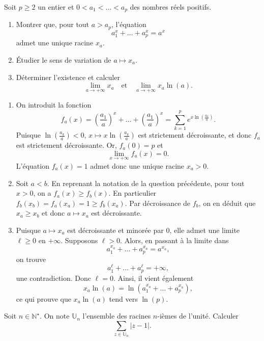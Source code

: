 \documentclass[a4paper, 11pt,openany]{book}%
\newtheorem[L]{thm}{Théorème}[section]
\newtheorem[M]{propo}[thm]{Proposition}
\newtheorem[M]{prop}[thm]{Propriété}
\newtheorem[M]{coro}[thm]{Corollaire}
\newtheorem[M]{lem}[thm]{Lemme}
\newtheorem[M,bodystyle=]{defi}[thm]{Définition}
\newtheorem[M,bodystyle=]{remark}[thm]{Remarque}
\newtheorem[M,bodystyle=]{met}[thm]{Méthode}
\newtheorem[M,bodystyle=]{ret}[thm]{A retenir}
\newtheorem[M,bodystyle=]{idee}[thm]{Idée}
\newtheorem[style=S,underline=false,bodystyle=]{exem}[thm]{Exemple}
\newtheorem[S,underline=false,bodystyle=]{exo}[thm]{Exercice}
\newtheorem[S,underline=false,bodystyle=]{appli}[thm]{Application}
\newtheorem[S,underline=false,bodystyle=]{sol}[thm]{Solution}
\newtheorem[S,underline=false,bodystyle=]{hypo}[thm]{Hypothesis}
\newtheorem[S,underline=false,bodystyle=]{nota}[thm]{Notation}
\begin{document}
\begin{exo}

Soit $p \geqslant 2$ un entier et $0<a_1< \dots <a_p$ des nombres réels positifs.
\begin{enumerate}
\item Montrer que, pour tout $a>a_p$, l'équation 
\[ a_1^x+ \dots +a_p^x =a^x\]
 admet une unique racine $x_a$.
 \item Étudier le sens de variation de $a \mapsto x_a$.
 \item Déterminer l'existence et calculer 
 \[ \lim_{a\to + \infty} x_a \quad \text{et} \quad \lim_{ a \to + \infty} x_a \ln(a). \]
\end{enumerate}

\end{exo}


\begin{sol}

\begin{enumerate}
\item On introduit la fonction 
\[ f_a(x)= \left( \frac{a_1}{a} \right)^x + \dots + \left( \frac{a_1}{a} \right)^x = \sum_{k=1}^p e^{x \ln \left( \frac{a_k}{a} \right)}.\]
Puisque $\ln \left( \frac{a_k}{a} \right)<0$, $x \mapsto x\ln \left( \frac{a_k}{a} \right)$ est strictement décroissante, et donc $f_a$ est strictement décroissante. Or, $f_a(0)=p$ et \[ \lim_{x\to + \infty} f_a(x) = 0.\]
L'équation $f_a(x)=1$ admet donc une unique racine $x_a>0$.
 \item Soit $a<b$. En reprenant la notation de la question précédente, pour tout $x>0$, on a $f_a(x) \geqslant f_b(x)$. En particulier $f_b(x_b)=f_a(x_a)=1 \geqslant f_b(x_a)$. Par décroissance de $f_b$, on en déduit que $x_a \geqslant x_b$ et donc $a \mapsto x_a$ est décroissante.
 \item Puisque $a\mapsto x_a$ est décroissante et minorée par $0$, elle admet une limite $\ell \geqslant 0$ en $+ \infty$. Supposons $\ell >0$. Alors, en passant à la limite dans 
 \[ a_1^{x_a} + \dots + a_p^{x_a}=a^{x_a},\]
 on trouve 
  \[ a_1^{\ell} + \dots + a_p^{\ell}=+ \infty,\]
une contradiction. Donc $\ell=0$. Ainsi, il vient également
\[ x_a \ln(a) = \ln \left(a_1^{x_a} + \dots + a_p^{x_a} \right),\]
ce qui prouve que $x_a \ln(a)$ tend vers $\ln(p)$. 
\end{enumerate}

\end{sol}

\begin{exo}

Soit $n \in \mathbb{N}^{\star}$. On note $\mathbb{U}_n$ l'ensemble des racines $n$-ièmes de l'unité. Calculer 
\[ \sum_{z \in \mathbb{U}_n} |z-1|.\]

\end{exo}
\end{document}

